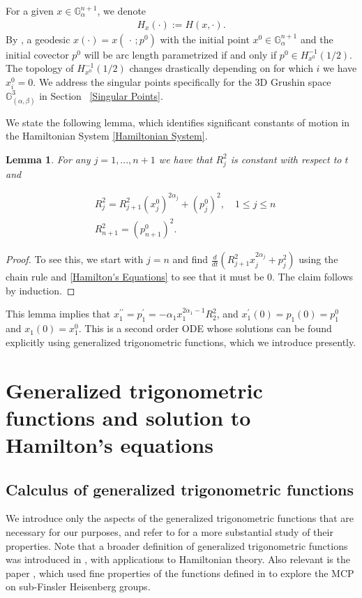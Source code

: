 \documentclass[12pt]{amsart}
\numberwithin{equation}{section}
\theoremstyle{plain}
\newtheorem{lemma}[theorem]{Lemma}%
\theoremstyle{definition}
\theoremstyle{remark}
\begin{document}
For a given $x \in \mathbb{G}^{n+1}_\alpha$, we denote \begin{align}\label{H function}
    H_{x}(\cdot):=H(x,\cdot).
\end{align}
By \cite[Theorem 4.25]{AgrachevBarilariBoscainBook2020}, a geodesic $x(\cdot)=x(\,\cdot\,;p^0)$ with the initial point $x^0\in \mathbb{G}^{n+1}_\alpha$ and the initial covector $p^0$ will be arc length parametrized if and only if $p^0\in H^{-1}_{x^0}(1/2)$.  The topology of $H^{-1}_{x^0}(1/2)$ changes drastically depending on for which $i$ we have  $x^0_i=0$. We address the singular points specifically for the 3D Grushin space $\mathbb{G}^3_{(\alpha,\beta)}$ in Section ~\ref{Singular Points}.

We state the following lemma, which identifies significant constants of motion in the Hamiltonian System \eqref{Hamiltonian System}.
\begin{lemma}
    For any $j=1, ..., n+1$ we have that $R^2_j$ is constant with respect to $t$ and

    \begin{align*}
         & R^2_j=R_{j+1}^2(x^0_j)^{2\alpha_j}+(p^0_j)^2, \quad 1\leqslant j\leqslant n
        \\
         & R^2_{n+1}=(p^0_{n+1})^2.
    \end{align*}
\end{lemma}

\begin{proof}
    To see this, we start with $j=n$ and find $\frac{d}{dt}(R^2_{j+1}x^{2\alpha_j}_j+p_j^2)$ using the chain rule and \eqref{Hamilton's Equations} to see that it must be $0$. The claim follows by induction.
\end{proof}
This lemma implies that $x_1^{\prime \prime}=p_1^{\prime}=-\alpha_1x_1^{2\alpha_1-1 }R_2^2$, and $x_1^{\prime}(0)=p_1(0)=p^0_1$ and $x_1(0)=x^0_1$. This is a second order ODE whose solutions can be found explicitly using generalized trigonometric functions, which we introduce presently.

\section{Generalized trigonometric functions and solution to Hamilton's equations}\label{s.GeneralizedTrig}

\subsection{Calculus of generalized trigonometric functions} We introduce only the aspects of the generalized trigonometric functions that are necessary for our purposes, and refer to \cite{KobayashiTakeuchi2019} for a more substantial study of their properties. Note that a broader definition of generalized trigonometric functions was introduced in \cite{Lokutsievskii2019}, with applications to Hamiltonian theory. Also relevant is the paper \cite{BorzaMagnaboscoRossiTashiro2024}, which used fine properties of the functions defined in \cite{Lokutsievskii2019} to explore the MCP on sub-Finsler Heisenberg groups.
\end{document}
